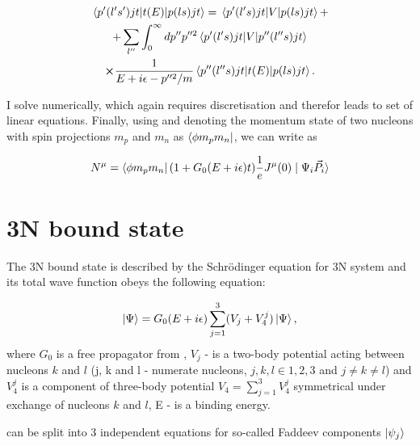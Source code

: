     \begin{multline}
        \matrixel{p^\prime (l^\prime s^\prime)jt}{t(E)}{p(ls)jt} = 
        \matrixel{p^\prime (l^\prime s)jt}{V}{p(ls)jt} + \\
        +\sum_{l^{\prime\prime}} \int_0^\infty dp^{\prime \prime} p^{\prime \prime 2}
        \matrixel{p^\prime (l^\prime s)jt}{V}{p^{\prime\prime}(l^{\prime\prime} s)jt} \\
        \cross \frac{1}{E + i\epsilon - p^{\prime \prime 2}/m}
        \matrixel{p^{\prime \prime} (l^{\prime \prime} s)jt}{t(E)}{p(l s)jt}.      
        \label{lse_pwd_reduced}
    \end{multline}

    I solve  numerically, which again requires discretisation
    and therefor leads to set of linear equations.
    Finally, using  and denoting the momentum state of two nucleons
    with spin projections $m_p$ and $m_n$ as $\bra{\phi m_p m_n}$, we can write  as
    
    \begin{equation}
        N^\mu = \bra{\phi m_p m_n} (1 + G_0(E + i\epsilon) t) \frac{1}{e}J^\mu(0) \mid \Psi_i \vec{P_i} \rangle
        \label{main_top}
    \end{equation}

    
\section{3N bound state}

    The 3N bound state is described by the Schr\"{o}dinger equation for 3N system
    and its total wave function obeys the following equation:

    \begin{equation}
        \ket{\Psi} = G_0(E+i\epsilon)\sum_{j=1}^3 (V_j + V_4^j) \ket{\Psi},
        \label{psi3_total}
    \end{equation}
    where $G_0$ is a free propagator from , $V_j$ - is a two-body potential
    acting between nucleons $k$ and $l$ (j, k and l - numerate nucleons, $j,k,l \in {1,2,3}$ and $j \neq k \neq l$)
    and $V_4^j$ is a component of three-body potential $V_4 = \sum_{j=1}^3 V_4^j$
    symmetrical under exchange of nucleons $k$ and $l$,
    E - is a binding energy.

     can be split into 3 independent equations for
    so-called Faddeev components $\ket{\psi_j}$

